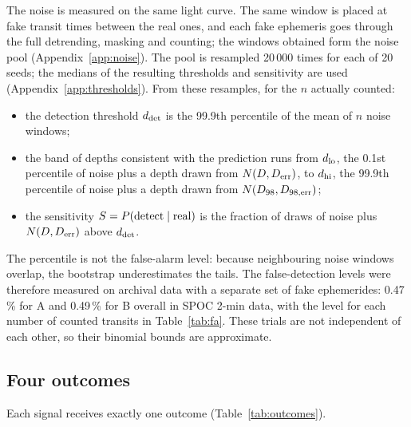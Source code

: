The noise is measured on the same light curve. The same window is placed at fake transit times between the real ones,
and each fake ephemeris goes through the full detrending, masking and counting; the windows obtained form the noise
pool (Appendix~\ref{app:noise}). The pool is resampled 20\,000 times for each of 20 seeds; the medians of the resulting thresholds and sensitivity
are used (Appendix~\ref{app:thresholds}).
From these resamples, for the $n$ actually counted:
\begin{itemize}
\item the detection threshold $d_{\rm det}$ is the 99.9th percentile of the mean of $n$ noise windows;
\item the band of depths consistent with the prediction runs from $d_{\rm lo}$, the 0.1st percentile of noise plus a depth
  drawn from $N(D, D_{\rm err})$, to $d_{\rm hi}$, the 99.9th percentile of noise plus a depth drawn from
  $N(D_{98}, D_{98,\rm err})$;
\item the sensitivity $S = P(\mathrm{detect} \mid \mathrm{real})$ is the fraction of draws of noise plus
  $N(D, D_{\rm err})$ above $d_{\rm det}$.
\end{itemize}
The percentile is not the false-alarm level: because neighbouring noise windows overlap, the bootstrap underestimates
the tails. The false-detection levels were therefore measured on archival data with a separate set of fake ephemerides:
0.47\,\% for A and 0.49\,\% for B overall in SPOC 2-min data, with the level for each number of counted transits in
Table~\ref{tab:fa}. These trials are not independent of each other, so their binomial bounds are approximate.

\subsection{Four outcomes} \label{sec:outcomes}

Each signal receives exactly one outcome (Table~\ref{tab:outcomes}).

